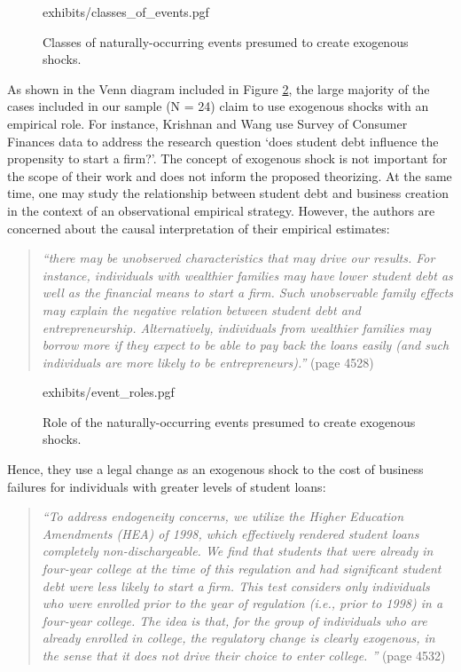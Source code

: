\documentclass[11pt]{article}
\begin{document}
\begin{refsection}
\begin{figure}[!htbp]
    \centering
    {exhibits/classes_of_events.pgf}
    \caption{Classes of naturally-occurring events presumed to create 
    exogenous shocks.}
    \label{fig:classes_of_events}
\end{figure}

As shown in the Venn diagram included in Figure \ref{fig:event_roles}, the large
majority of the cases included in our sample (N = 24) claim to use exogenous
shocks with an empirical role. For instance, Krishnan and Wang
\autocite*{krishnan20194522} use Survey of Consumer Finances data to address the
research question `does student debt influence the propensity to start a firm?'.
The concept of exogenous shock is not important for the scope of their work and
does not inform the proposed theorizing. At the same time, one may study the
relationship between student debt and business creation in the context of an
observational empirical strategy. However, the authors are concerned about the
causal interpretation of their empirical estimates:

\begin{quote}
  \textit{
  ``there may be unobserved characteristics that may drive our results. For
  instance, individuals with wealthier families may have lower student debt as
  well as the financial means to start a firm. Such unobservable family effects
  may explain the negative relation between student debt and entrepreneurship.
  Alternatively, individuals from wealthier families may borrow more if they
  expect to be able to pay back the loans easily (and such individuals are more
  likely to be entrepreneurs).''
  }
  (page 4528)
\end{quote}

\begin{figure}[!htbp]
    \centering
    {exhibits/event_roles.pgf}
    \caption{Role of the naturally-occurring events presumed to create exogenous shocks.}
    \label{fig:event_roles}
\end{figure}

Hence, they use a legal change as an exogenous shock to the cost of business 
failures for individuals with greater levels of student loans:

\begin{quote}
  \textit{
  ``To address endogeneity concerns, we utilize the Higher Education Amendments
  (HEA) of 1998, which effectively rendered student loans completely
  non-dischargeable. We find that students that were already in four-year college
  at the time of this regulation and had significant student debt were less
  likely to start a firm. This test considers only individuals who were enrolled
  prior to the year of regulation (i.e., prior to 1998) in a four-year college.
  The idea is that, for the group of individuals who are already enrolled in
  college, the regulatory change is clearly exogenous, in the sense that it
  does not drive their choice to enter college. ''
  }
  (page 4532)
\end{quote}


\end{refsection}
\end{document}
